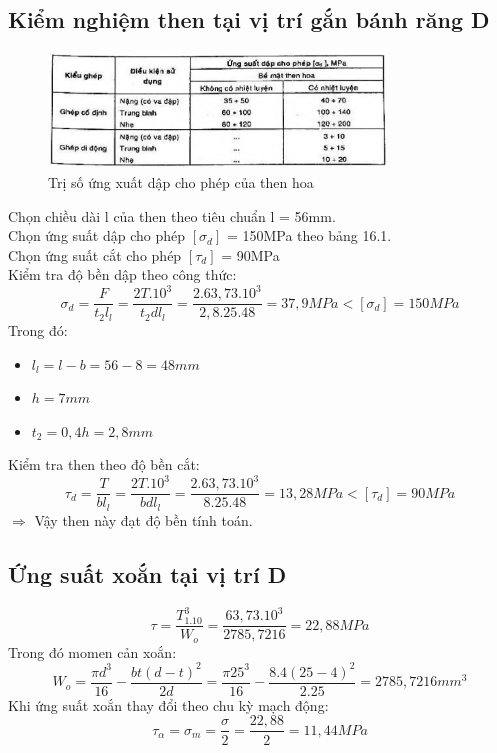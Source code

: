 \subsection{Kiểm nghiệm then tại vị trí gắn bánh răng D}
\begin{figure}[H]
    \centering
    \includegraphics[width=0.8\textwidth]{pictures/then1.png}
    \caption{Trị số ứng xuất dập cho phép của then hoa}
\end{figure}
Chọn chiều dài l của then theo tiêu chuẩn l = 56mm.\\
Chọn ứng suất dập cho phép $[\sigma_d]$ = 150MPa theo bảng 16.1. \\
Chọn ứng suất cắt cho phép $[\tau_d]$ = 90MPa \\
Kiểm tra độ bền dập theo công thức:
\[
    \sigma_d = \frac{F}{t_2l_l} = \frac{2T.10^3}{t_2dl_l} = \frac{2.63,73.10^3}{2,8.25.48} = 37,9MPa < [\sigma_d] = 150MPa
\]
Trong đó:
\begin{itemize}
    \item $l_l = l - b = 56 - 8 = 48mm$
    \item $h = 7mm$
    \item $t_2 = 0,4h = 2,8mm$
\end{itemize}
Kiểm tra then theo độ bền cắt: 
\[
    \tau_d = \frac{T}{bl_l} = \frac{2T.10^3}{bdl_l} = \frac{2.63,73.10^3}{8.25.48} = 13,28MPa < [\tau_d] = 90MPa 
\]
$\Rightarrow$ Vậy then này đạt độ bền tính toán.
\subsection{Ứng suất xoắn tại vị trí D}
\[
    \tau = \frac{T_1.10^3}{W_o} = \frac{63,73.10^3}{2785,7216} = 22,88MPa
\]
Trong đó momen cản xoắn:
\[
    W_o = \frac{\pi d^3}{16} - \frac{bt(d-t)^2}{2d} = \frac{\pi 25^3}{16} - \frac{8.4(25-4)^2}{2.25} = 2785,7216mm^3
\]
Khi ứng suất xoắn thay đổi theo chu kỳ mạch động: 
\[
    \tau_\alpha = \sigma_m = \frac{\sigma}{2} = \frac{22,88}{2} = 11,44MPa
\]
